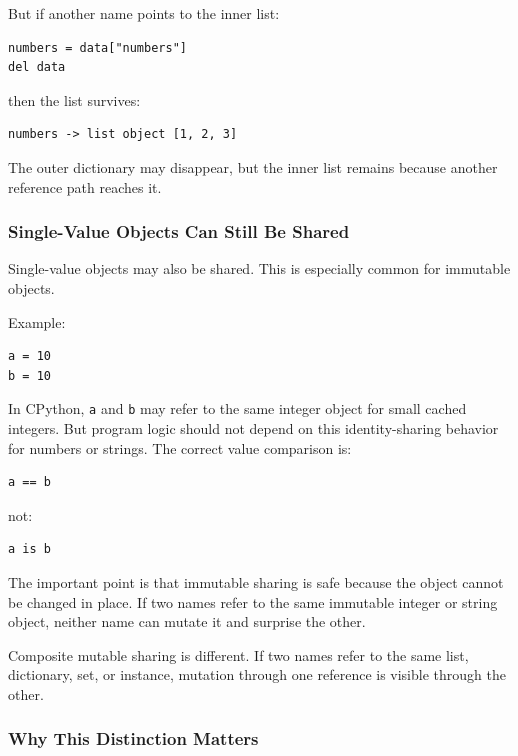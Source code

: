 But if another name points to the inner list:

\begin{verbatim}
numbers = data["numbers"]
del data
\end{verbatim}

then the list survives:

\begin{verbatim}
numbers -> list object [1, 2, 3]
\end{verbatim}

The outer dictionary may disappear, but the inner list remains because another reference path reaches it.

\subsubsection*{Single-Value Objects Can Still Be Shared}

Single-value objects may also be shared. This is especially common for immutable objects.

Example:

\begin{verbatim}
a = 10
b = 10
\end{verbatim}

In CPython, \texttt{a} and \texttt{b} may refer to the same integer object for small cached integers. But program logic should not depend on this identity-sharing behavior for numbers or strings. The correct value comparison is:

\begin{verbatim}
a == b
\end{verbatim}

not:

\begin{verbatim}
a is b
\end{verbatim}

The important point is that immutable sharing is safe because the object cannot be changed in place. If two names refer to the same immutable integer or string object, neither name can mutate it and surprise the other.

Composite mutable sharing is different. If two names refer to the same list, dictionary, set, or instance, mutation through one reference is visible through the other.

\subsubsection*{Why This Distinction Matters}

